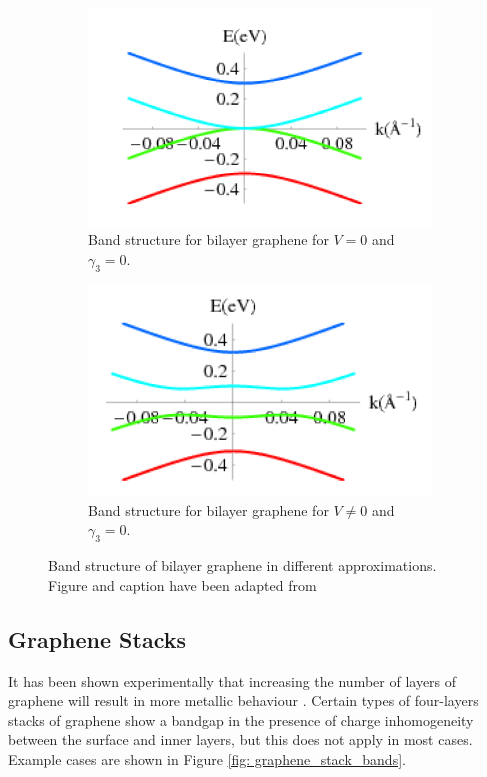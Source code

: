 \documentclass[]{article}
\begin{document}
\begin{figure}[htb]
	\begin{subfigure}[b]{0.4\textwidth}
		\includegraphics[width=\textwidth]{bilayer_touching_bands.PNG}
		\caption{Band structure for bilayer graphene for $V=0$ and $\gamma_3 = 0$.}
		\label{fig: Bilayer_touching_bands}
	\end{subfigure}
	\hfill
	\begin{subfigure}[b]{0.4\textwidth}
		\includegraphics[width=\textwidth]{bilayer_separate_bands.PNG}
		\caption{Band structure for bilayer graphene for $V \neq 0$ and $\gamma_3 = 0$.}
		\label{fig: Bilayer_separate_bands}
	\end{subfigure}
	\caption{Band structure of bilayer graphene in different approximations. Figure and caption have been adapted from \cite{The_Electronic_Properties_of_Graphene}}
\end{figure}

\subsection{Graphene Stacks}
It has been shown experimentally that increasing the number of layers of graphene will result in more metallic behaviour \cite{The_Electronic_Properties_of_Graphene}. Certain types of four-layers stacks of graphene show a bandgap in the presence of charge inhomogeneity between the surface and inner layers, but this does not apply in most cases. Example cases are shown in Figure \ref{fig: graphene_stack_bands}.
\newline
\end{document}
